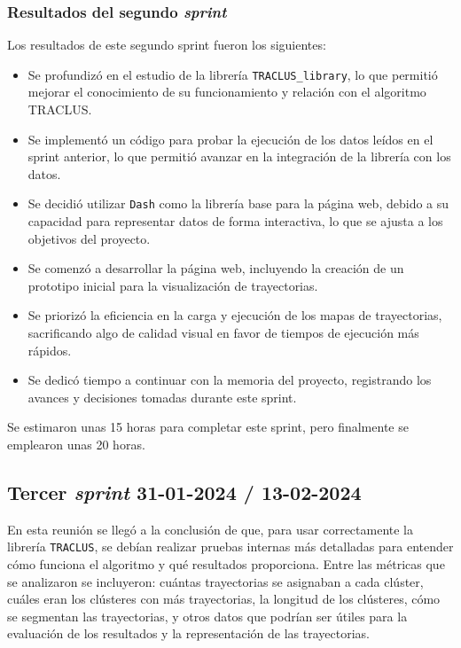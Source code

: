 \subsubsection{Resultados del segundo \textit{sprint}}

Los resultados de este segundo sprint fueron los siguientes:

\begin{itemize}
    \item Se profundizó en el estudio de la librería \texttt{TRACLUS\_library}, lo que permitió mejorar el conocimiento de su funcionamiento y relación con el algoritmo TRACLUS.
    
    \item Se implementó un código para probar la ejecución de los datos leídos en el sprint anterior, lo que permitió avanzar en la integración de la librería con los datos.
    
    \item Se decidió utilizar \texttt{Dash} como la librería base para la página web, debido a su capacidad para representar datos de forma interactiva, lo que se ajusta a los objetivos del proyecto.
    
    \item Se comenzó a desarrollar la página web, incluyendo la creación de un prototipo inicial para la visualización de trayectorias.
    
    \item Se priorizó la eficiencia en la carga y ejecución de los mapas de trayectorias, sacrificando algo de calidad visual en favor de tiempos de ejecución más rápidos.
    
    \item Se dedicó tiempo a continuar con la memoria del proyecto, registrando los avances y decisiones tomadas durante este sprint.
\end{itemize}

Se estimaron unas 15 horas para completar este sprint, pero finalmente se emplearon unas 20 horas.

\subsection{Tercer \textit{sprint} 31-01-2024 / 13-02-2024}

En esta reunión se llegó a la conclusión de que, para usar correctamente la librería \texttt{TRACLUS}, se debían realizar pruebas internas más detalladas para entender cómo funciona el algoritmo y qué resultados proporciona. Entre las métricas que se analizaron se incluyeron: cuántas trayectorias se asignaban a cada clúster, cuáles eran los clústeres con más trayectorias, la longitud de los clústeres, cómo se segmentan las trayectorias, y otros datos que podrían ser útiles para la evaluación de los resultados y la representación de las trayectorias.

